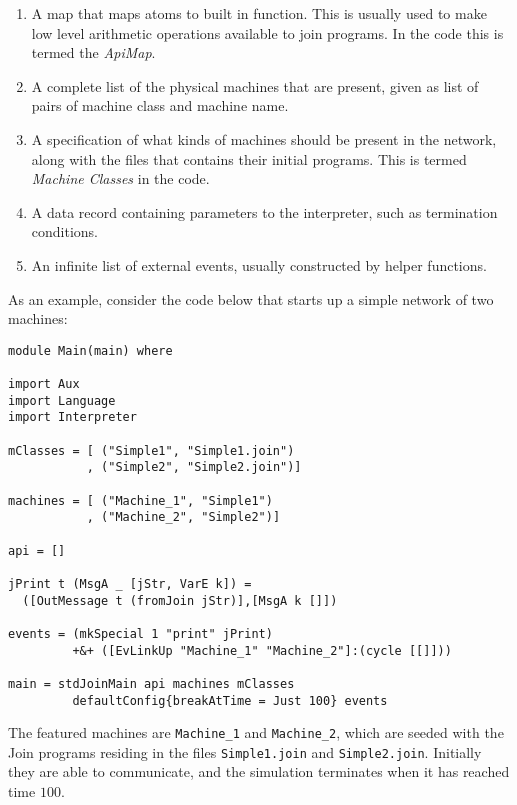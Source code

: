 \begin{enumerate}

\item A map that maps atoms to built in function. This is usually used to make
low level arithmetic operations available to join programs. In the code this is
termed the \emph{ApiMap}.

\item A complete list of the physical machines that are present, given as list
of pairs of machine class and machine name.

\item A specification of what kinds of machines should be present in the
network, along with the files that contains their initial programs. This is
termed \emph{Machine Classes} in the code.

\item A data record containing parameters to the interpreter, such as
termination conditions.

\item An infinite list of external events, usually constructed by helper
functions.

\end{enumerate}

As an example, consider the code below that starts up a simple network of two
machines:
\begin{verbatim}
module Main(main) where

import Aux
import Language
import Interpreter

mClasses = [ ("Simple1", "Simple1.join")
           , ("Simple2", "Simple2.join")]

machines = [ ("Machine_1", "Simple1")
           , ("Machine_2", "Simple2")]

api = []

jPrint t (MsgA _ [jStr, VarE k]) =
  ([OutMessage t (fromJoin jStr)],[MsgA k []])

events = (mkSpecial 1 "print" jPrint)
         +&+ ([EvLinkUp "Machine_1" "Machine_2"]:(cycle [[]]))

main = stdJoinMain api machines mClasses
         defaultConfig{breakAtTime = Just 100} events
\end{verbatim}

The featured machines are \texttt{Machine\_1} and \texttt{Machine\_2}, which are
seeded with the Join programs residing in the files \texttt{Simple1.join} and
\texttt{Simple2.join}. Initially they are able to communicate, and the
simulation terminates when it has reached time $100$.

